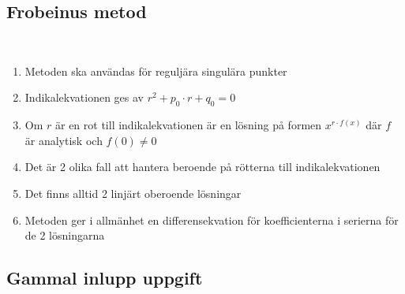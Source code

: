 \subsection{Frobeinus metod}\hfill\\
\par

\begin{enumerate}

  \item Metoden ska användas för reguljära singulära punkter
  \item Indikalekvationen ges av $r^2+p_0\cdot r+q_0=0$
  \item Om $r$ är en rot till indikalekvationen är en lösning på formen $x^{r\cdot f(x)}$ där $f$ är analytisk och $f(0)\neq0$
  \item Det är 2 olika fall att hantera beroende på rötterna till indikalekvationen
  \item Det finns alltid 2 linjärt oberoende lösningar
  \item Metoden ger i allmänhet en differensekvation för koefficienterna i serierna för de 2 lösningarna 

\end{enumerate}
\par\bigskip

\subsection{Gammal inlupp uppgift}\hfill\\
\par

